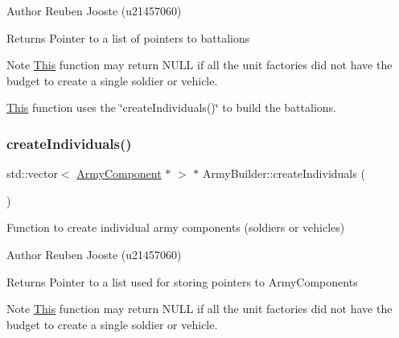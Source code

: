 \begin{DoxyAuthor}{Author}
Reuben Jooste (u21457060) 
\end{DoxyAuthor}
\begin{DoxyReturn}{Returns}
Pointer to a list of pointers to battalions 
\end{DoxyReturn}
\begin{DoxyNote}{Note}
\mbox{\hyperlink{class_this}{This}} function may return N\+U\+LL if all the unit factories did not have the budget to create a single soldier or vehicle. 

\mbox{\hyperlink{class_this}{This}} function uses the \char`\"{}create\+Individuals()\char`\"{} to build the battalions. 
\end{DoxyNote}
\mbox{\label{class_army_builder_aefae08ee6f43f41d94d06891ad6fdbbb}} 
\subsubsection{\texorpdfstring{createIndividuals()}{createIndividuals()}}
{\footnotesize\ttfamily std\+::vector$<$ \mbox{\hyperlink{class_army_component}{Army\+Component}} $\ast$ $>$ $\ast$ Army\+Builder\+::create\+Individuals (\begin{DoxyParamCaption}{ }\end{DoxyParamCaption})}



Function to create individual army components (soldiers or vehicles) 

\begin{DoxyAuthor}{Author}
Reuben Jooste (u21457060) 
\end{DoxyAuthor}
\begin{DoxyReturn}{Returns}
Pointer to a list used for storing pointers to Army\+Components 
\end{DoxyReturn}
\begin{DoxyNote}{Note}
\mbox{\hyperlink{class_this}{This}} function may return N\+U\+LL if all the unit factories did not have the budget to create a single soldier or vehicle. 
\end{DoxyNote}
\mbox{\label{class_army_builder_ae999bf5bc4c83243f2d000e6f981c986}} 
